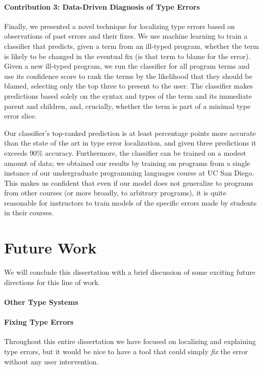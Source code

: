 \paragraph{Contribution 3: Data-Driven Diagnosis of Type Errors}
Finally, we presented a novel technique for localizing type errors based
on observations of past errors and their fixes.
%
We use machine learning to train a classifier that predicts, given a
term from an ill-typed program, whether the term is likely to be changed
in the eventual fix (\ie is that term to blame for the error).
%
Given a new ill-typed program, we run the classifier for all program
terms and use its confidence score to rank the terms by the likelihood
that they should be blamed, selecting only the top three to present to
the user.
%
The classifier makes predictions based solely on the syntax and types of
the term and its immediate parent and children, and, crucially, whether
the term is part of a minimal type error slice.

Our classifier's top-ranked prediction is at least \ToolnameWinSherrloc
percentage points more accurate than the state of the art in type error
localization, and given three predictions it exceeds 90\% accuracy.
%
Furthermore, the classifier can be trained on a modest amount of data;
we obtained our results by training on programs from a single instance
of our undergraduate programming languages course at UC San Diego.
%
This makes us confident that even if our model does not generalize to
programs from other courses (or more broadly, to arbitrary \ocaml
programs), it is quite reasonable for instructors to train models of the
specific errors made by students in their courses.


\section{Future Work}
\label{sec:conc:future-work}
We will conclude this dissertation with a brief discussion of some
exciting future directions for this line of work.

\paragraph{Other Type Systems}


\paragraph{Fixing Type Errors}
Throughout this entire dissertation we have focused on localizing and
explaining type errors, but %
it would be nice to have a tool that
could simply \emph{fix} the error without any user intervention.

